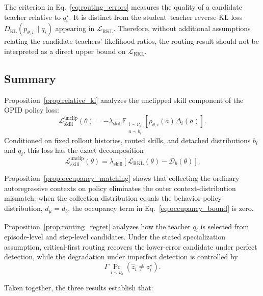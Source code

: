 \documentclass{llmxive}
\begin{document}
The criterion in Eq.~\ref{eq:routing_errors} measures the quality of a
candidate teacher relative to \(q_i^\star\). It is distinct from the
student--teacher reverse-KL loss
\(D_{\mathrm{KL}}(p_{\theta,i}\|q_i)\) appearing in
\(\mathcal L_{\mathrm{RKL}}\). Therefore, without additional assumptions
relating the candidate teachers' likelihood ratios, the routing result
should not be interpreted as a direct upper bound on
\(\mathcal L_{\mathrm{RKL}}\).


\subsection{Summary}
\label{app:theory_scope}

Proposition~\ref{prop:relative_kl} analyzes the unclipped skill component
of the OPID policy loss:
\begin{equation*}
 \mathcal L_{\mathrm{skill}}^{\mathrm{unclip}}(\theta)
 =
 -
 \lambda_{\mathrm{skill}}
 \mathbb E_{\substack{i\sim\nu_b\\a\sim b_i}}
 \left[
   \rho_{\theta,i}(a)\Delta_i(a)
 \right].
\end{equation*}
Conditioned on fixed rollout histories, routed skills, and detached
distributions \(b_i\) and \(q_i\), this loss has the exact decomposition
\begin{equation*}
 \mathcal L_{\mathrm{skill}}^{\mathrm{unclip}}(\theta)
 =
 \lambda_{\mathrm{skill}}
 \left[
   \mathcal L_{\mathrm{RKL}}(\theta)
   -
   \mathcal D_b(\theta)
 \right].
\end{equation*}

Proposition~\ref{prop:occupancy_matching}  shows that collecting the ordinary autoregressive
contexts on policy eliminates the outer context-distribution mismatch:
when the collection distribution equals the behavior-policy distribution,
\(d_\mu=d_b\), the occupancy term in
Eq.~\ref{eq:occupancy_bound} is zero. 

Proposition~\ref{prop:routing_regret} analyzes how the teacher \(q_i\) is
selected from episode-level and step-level candidates. Under the stated
specialization assumption, critical-first routing recovers the lower-error
candidate under perfect detection, while the degradation under imperfect
detection is controlled by
\begin{equation*}
 \Gamma
 \Pr_{i\sim\nu_b}
 \left(
   \widehat z_i\ne z_i^\star
 \right).
\end{equation*}

Taken together, the three results establish that:
\end{document}
